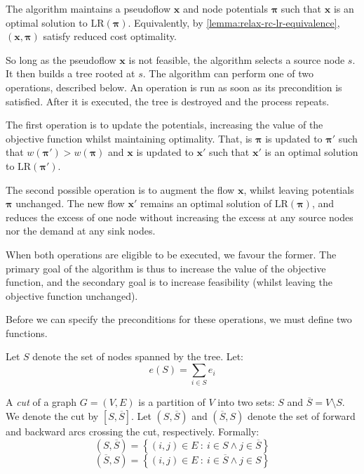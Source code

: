 The algorithm maintains a pseudoflow $\mathbf{x}$ and node potentials $\boldsymbol{\pi}$ such that $\mathbf{x}$ is an optimal solution to $\mathrm{LR}(\boldsymbol{\pi})$. Equivalently, by \cref{lemma:relax-rc-lr-equivalence}, $\left(\mathbf{x},\boldsymbol{\pi}\right)$ satisfy reduced cost optimality.

So long as the pseudoflow $\mathbf{x}$ is not feasible, the algorithm selects a source node $s$. It then builds a tree rooted at $s$. The algorithm can perform one of two operations, described below. An operation is run as soon as its precondition is satisfied. After it is executed, the tree is destroyed and the process repeats.

The first operation is to update the potentials, increasing the value of the objective function whilst maintaining optimality. That, is $\boldsymbol{\pi}$ is updated to $\boldsymbol{\pi}'$ such that $w\left(\boldsymbol{\pi}'\right) > w\left(\boldsymbol{\pi}\right)$ and $\mathbf{x}$ is updated to $\mathbf{x}'$ such that $\mathbf{x}'$ is an optimal solution to $\mathrm{LR}(\boldsymbol{\pi}')$.

The second possible operation is to augment the flow $\mathbf{x}$, whilst leaving potentials $\boldsymbol{\pi}$ unchanged. The new flow $\mathbf{x}'$ remains an optimal solution of $\mathrm{LR}(\boldsymbol{\pi})$, and reduces the excess of one node without increasing the excess at any source nodes nor the demand at any sink nodes.

When both operations are eligible to be executed, we favour the former. The primary goal of the algorithm is thus to increase the value of the objective function, and the secondary goal is to increase feasibility (whilst leaving the objective function unchanged).

Before we can specify the preconditions for these operations, we must define two functions.

\begin{defn} \label{defn:relax-tree-excess}
Let $S$ denote the set of nodes spanned by the tree. Let:
\begin{equation} \label{eq:relax-tree-excess}
e(S) = \sum_{i \in S} e_i
\end{equation}
\end{defn}

\begin{defn}[Cuts] \label{defn:relax-cuts}
A \emph{cut} of a graph $G = (V,E)$ is a partition of $V$ into two sets: $S$ and $\overline{S} = V \setminus S$. We denote the cut by $\left[S,\overline{S}\right]$. Let $\left(S,\overline{S}\right)$ and $\left(\overline{S},S\right)$ denote the set of forward and backward arcs crossing the cut, respectively. Formally:
\[\left(S,\overline{S}\right) = \left\{(i,j) \in E\::\: i \in S \land j \in \overline{S} \right\}\]
\[\left(\overline{S},S\right) = \left\{(i,j) \in E\::\: i \in \overline{S} \land j \in S \right\}\]
\end{defn}

